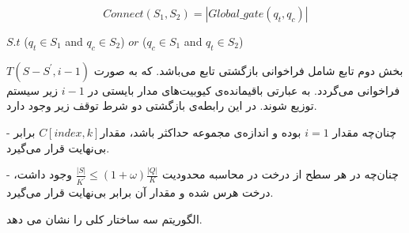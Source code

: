 \begin{itemize}
\begin {equation}
 Connect (S_{1},S_{2})=| Global\_gate(q_{t},q_{c})|
\label{eq261}
\end{equation}
\begin{center}
\begin{latin}
 $S.t$      ($q_{t} \in S_{1}$  and  $q_{c}\in S_{2}$)    $or$       ($q_{c} \in S_{1}$ and  $q_{t}\in S_{2}$)
 \end{latin}
\end{center}
\end{itemize}

بخش دوم تابع شامل فراخوانی بازگشتی تابع می‌باشد. که به صورت $T(S-S^{'},i-1)$ فراخوانی می‌گردد. به عبارتی باقیمانده‌ی کیوبیت‌های مدار بایستی در $i-1 $ زیر سیستم توزیع شوند. 
در این رابطه‌ی بازگشتی دو شرط توقف زیر وجود دارد.

- چنان‌چه مقدار $i=1 $ بوده و اندازه‌ی مجموعه   حداکثر  باشد، مقدار$C[index,k]$ برابر بی‌نهایت قرار می‌گیرد.

- چنان‌چه در هر سطح از درخت در محاسبه  محدودیت $\frac{|S|}{K^{'}} \leq (1+\omega)\frac{|Q|}{K}$ وجود داشت، درخت هرس شده و مقدار آن برابر بی‌نهایت قرار می‌گیرد.



الگوریتم سه ساختار کلی را نشان می دهد.

